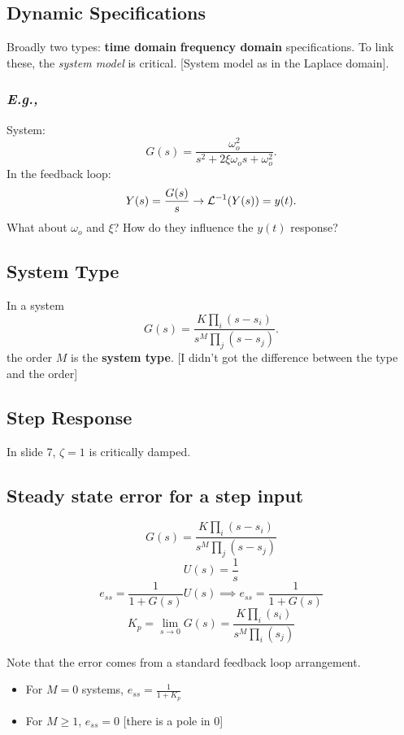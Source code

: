 \subsection*{Dynamic Specifications}

Broadly two types: \textbf{time domain} \textbf{frequency domain} specifications. To link these,
the \emph{system model} is critical. [System model as in the Laplace domain].

\subsubsection*{\emph{E.g.,}}

System:
\[
    G(s)= \frac{\omega_o^{2}}{s^{2}+2\xi \omega_o s + \omega_o^{2}}
.\] 
In the feedback loop:
\[
    Y(s)=\frac{G(s)}{s} \to  \mathcal{L}^{-1}(Y(s))=y(t)
.\] 
What about $\omega_o$ and $\xi$? How do they influence the $y(t)$ response?

\subsection*{System Type}

\begin{definition}
    In a system \[
	G(s)=\frac{K \prod_{i}\left( s-s_i \right) }{s^{M}\prod_{j} (s-s_j)}
    .\]
    the order $M$ is the \textbf{system type}. [I didn't got the difference between the type and
    the order]
\end{definition}

\subsection*{Step Response}

In slide 7, $\zeta =1$ is critically damped.

\subsection*{Steady state error for a step input}
\[
	G(s)=\frac{K \prod_{i}\left( s-s_i \right) }{s^{M}\prod_{j} (s-s_j)}
\] 
\[
	U(s) = \frac{1}{s}
\] 
\[
    e_{ss} = \frac{1}{1+G(s)} U(s) \implies e_{ss}=\frac{1}{1+G(s)}
\] 
\[
	K_p = \lim_{s \to 0} G(s) = \frac{K \prod_{i} (s_i)}{s^{M} \prod_{i} (s_j)}    
\] 

Note that the error comes from a standard feedback loop arrangement.

\begin{itemize}
    \item For $M=0$ systems, $e_{ss}=\frac{1}{1+ K_p}$
    \item For $M\ge 1$, $e_{ss}=0$ [there is a pole in 0]
\end{itemize}


